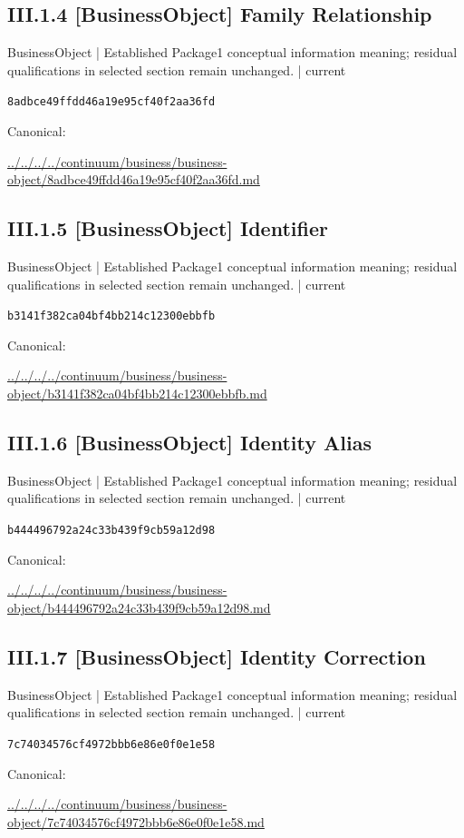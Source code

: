\documentclass[10pt,a4paper]{article}
\begin{document}
\subsection*{III.1.4 [BusinessObject] Family Relationship}
{\small BusinessObject | Established Package1 conceptual information meaning; residual qualifications in selected section remain unchanged. | current}\par
\texttt{8adbce49ffdd46a19e95cf40f2aa36fd}\par
Canonical: \par
{\footnotesize\url{../../../../continuum/business/business-object/8adbce49ffdd46a19e95cf40f2aa36fd.md}}\par
\subsection*{III.1.5 [BusinessObject] Identifier}
{\small BusinessObject | Established Package1 conceptual information meaning; residual qualifications in selected section remain unchanged. | current}\par
\texttt{b3141f382ca04bf4bb214c12300ebbfb}\par
Canonical: \par
{\footnotesize\url{../../../../continuum/business/business-object/b3141f382ca04bf4bb214c12300ebbfb.md}}\par
\subsection*{III.1.6 [BusinessObject] Identity Alias}
{\small BusinessObject | Established Package1 conceptual information meaning; residual qualifications in selected section remain unchanged. | current}\par
\texttt{b444496792a24c33b439f9cb59a12d98}\par
Canonical: \par
{\footnotesize\url{../../../../continuum/business/business-object/b444496792a24c33b439f9cb59a12d98.md}}\par
\subsection*{III.1.7 [BusinessObject] Identity Correction}
{\small BusinessObject | Established Package1 conceptual information meaning; residual qualifications in selected section remain unchanged. | current}\par
\texttt{7c74034576cf4972bbb6e86e0f0e1e58}\par
Canonical: \par
{\footnotesize\url{../../../../continuum/business/business-object/7c74034576cf4972bbb6e86e0f0e1e58.md}}\par
\end{document}
